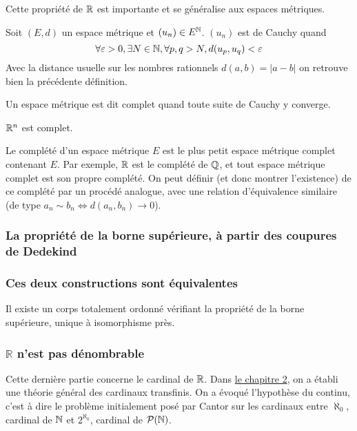Cette propriété de $\mathbb{R}$ est importante et se généralise aux espaces métriques.

\begin{defini}
    Soit $(E,d)$ un espace métrique et $(u_n) \in E^{\mathbb{N}}$. $(u_n)$ est de Cauchy quand
    $$\forall \varepsilon > 0, \exists N \in \mathbb{N}, \forall p, q > N, d(u_p, u_q) < \varepsilon$$
    \tcblower
    Avec la distance usuelle sur les nombres rationnels $d(a,b)=|a-b|$ on retrouve bien la précédente définition.
\end{defini}

\begin{defini}
    Un espace métrique est dit complet quand toute suite de Cauchy y converge.
\end{defini}

\begin{ex}
    $\mathbb{R}^n$ est complet.
    \tcblower
\end{ex}

Le complété d'un espace métrique $E$ est le plus petit espace métrique complet contenant $E$. Par exemple, $\mathbb{R}$ est le complété de $\mathbb{Q}$, et tout espace métrique complet est son propre complété.
On peut définir (et donc montrer l'existence) de ce complété par un procédé analogue, avec une relation d'équivalence similaire (de type $a_n \sim b_n \iff d(a_n, b_n) \to 0$). 

\subsubsection{La propriété de la borne supérieure, à partir des coupures de Dedekind}

\subsubsection{Ces deux constructions sont équivalentes}
\begin{theoreme}
    Il existe un corps totalement ordonné vérifiant la propriété de la borne supérieure, unique à isomorphisme près.    
\end{theoreme}

\subsubsection{\texorpdfstring{$\mathbb{R}$}{R} n'est pas dénombrable}
Cette dernière partie concerne le cardinal de $\mathbb{R}$. Dans \hyperref[card]{le chapitre 2}, on a établi une théorie général des cardinaux transfinis. On a évoqué l'hypothèse du continu, c'est à dire le problème initialement posé par Cantor sur les cardinaux entre $\aleph_0$, cardinal de $\mathbb{N}$ et $2^{\aleph_0}$, cardinal de $\mathcal{P}(\mathbb{N})$.

